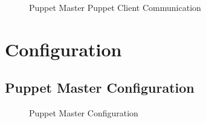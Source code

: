 \documentclass[9pt,twocolumn,twoside]{styles/osajnl}
\begin{document}
\begin{figure}[htbp]
\centering
{}
\caption{Puppet Master Puppet Client Communication}
\label{fig:Puppet}
\end{figure}


\section{Configuration}


\subsection {Puppet Master Configuration}

\begin{figure}[htbp]
\centering
{}
\caption{Puppet Master Configuration}
\label{fig:Puppet}
\end{figure} \cite{www-techarena}
\end{document}
